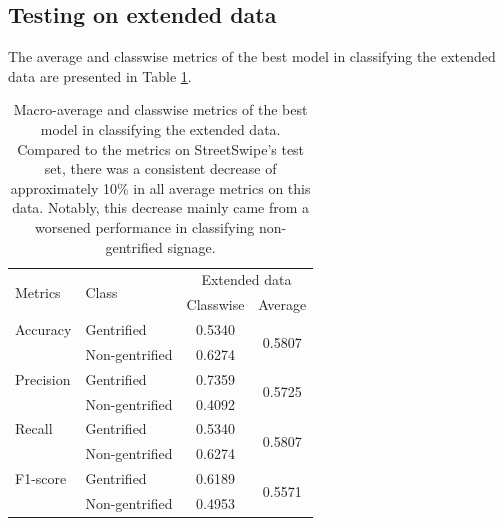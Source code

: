 \subsection{Testing on extended data}
The average and classwise metrics of the best model in classifying the extended data are presented in Table \ref{fig:resnet50_pano}.

\begin{table}[H]
\begin{tabular}{llcc}
\multirow{2}{*}{Metrics}   & \multirow{2}{*}{Class} & \multicolumn{2}{c}{Extended data}   \\ \cline{3-4} 
                           &                        & Classwise & Average                 \\ \hline
Accuracy                   & Gentrified             & 0.5340    & \multirow{2}{*}{0.5807} \\
                           & Non-gentrified         & 0.6274    &                         \\
Precision                  & Gentrified             & 0.7359    & \multirow{2}{*}{0.5725} \\
                           & Non-gentrified         & 0.4092    &                         \\
Recall                     & Gentrified             & 0.5340    & \multirow{2}{*}{0.5807} \\
                           & Non-gentrified         & 0.6274    &                         \\
F1-score                   & Gentrified             & 0.6189    & \multirow{2}{*}{0.5571} \\
                           & Non-gentrified         & 0.4953    &                        
\end{tabular}
\caption{Macro-average and classwise metrics of the best model in classifying the extended data. Compared to the metrics on StreetSwipe's test set, there was a consistent decrease of approximately 10\% in all average metrics on this data. Notably, this decrease mainly came from a worsened performance in classifying non-gentrified signage.}
\label{fig:resnet50_pano}
\end{table}

